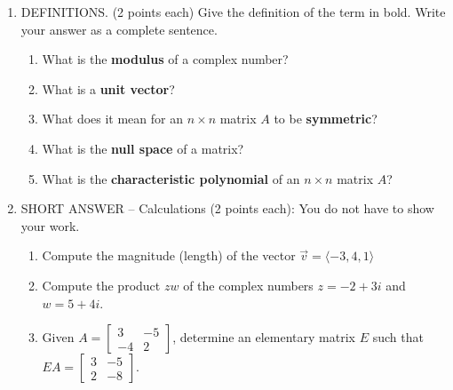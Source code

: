 \documentclass[12pt]{article}
\newcommand{\bbm}{\begin{bmatrix}}
\newcommand{\ebm}{\end{bmatrix}}
\begin{document}
\begin{enumerate}
\item DEFINITIONS. (2 points each) Give the definition of the term in bold. Write your answer as a complete sentence. 

\begin{enumerate}
 \item What is the \textbf{modulus} of a complex number?

\vspace{1.3in}

 \item What is a \textbf{unit vector}?

\vspace{1.3in}

 \item What does it mean for an $n\times n$ matrix $A$ to be \textbf{symmetric}?

\vspace{1.3in}

 \item What is the \textbf{null space} of a matrix?

\vspace{1.3in}

 \item What is the \textbf{characteristic polynomial} of an $n\times n$ matrix $A$?


 
\end{enumerate}
\newpage

\item SHORT ANSWER -- Calculations (2 points each): You do not have to show your work.

\begin{enumerate}
 \item Compute the magnitude (length) of the vector $\vec{v} = \langle -3,4,1\rangle$

\vspace{1.5in}

 \item Compute the product $zw$ of the complex numbers $z=-2+3i$  and $w=5+4i$.

\vspace{1.5in}

 

 \item Given $A = \bbm 3&-5\\-4&2\ebm$, determine an elementary matrix $E$ such that $EA = \bbm 3&-5\\2&-8\ebm$.


\end{enumerate}
\end{enumerate}
\end{document}
